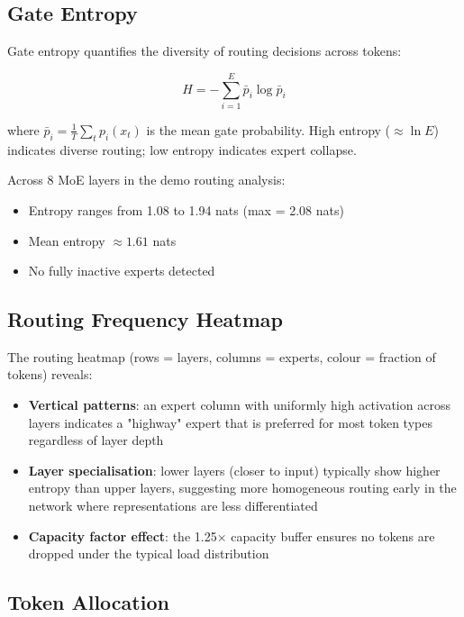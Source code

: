 \documentclass[11pt]{article}
\begin{document}
\subsection{Gate Entropy}


Gate entropy quantifies the diversity of routing decisions across tokens:


$$H = -\sum_{i=1}^{E} \bar{p}_i \log \bar{p}_i$$


where $\bar{p}_i = \frac{1}{T}\sum_t p_i(x_t)$ is the mean gate probability. High entropy ($\approx \ln E$) indicates diverse routing; low entropy indicates expert collapse.


Across 8 MoE layers in the demo routing analysis:

\begin{itemize}[leftmargin=*]
\item Entropy ranges from 1.08 to 1.94 nats (max = 2.08 nats)
\item Mean entropy $\approx 1.61$ nats
\item No fully inactive experts detected

\end{itemize}
\subsection{Routing Frequency Heatmap}


The routing heatmap (rows = layers, columns = experts, colour = fraction of tokens) reveals:

\begin{itemize}[leftmargin=*]
\item \textbf{Vertical patterns}: an expert column with uniformly high activation across layers indicates a "highway" expert that is preferred for most token types regardless of layer depth
\item \textbf{Layer specialisation}: lower layers (closer to input) typically show higher entropy than upper layers, suggesting more homogeneous routing early in the network where representations are less differentiated
\item \textbf{Capacity factor effect}: the 1.25× capacity buffer ensures no tokens are dropped under the typical load distribution

\end{itemize}
\subsection{Token Allocation}
\end{document}

